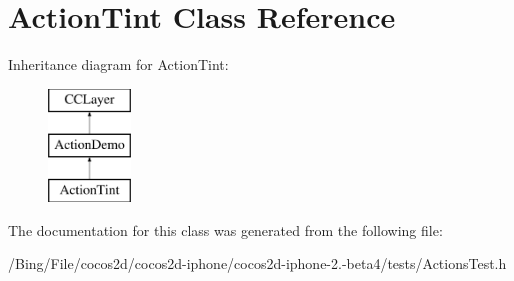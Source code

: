 \hypertarget{interface_action_tint}{\section{Action\-Tint Class Reference}
\label{interface_action_tint}
}
Inheritance diagram for Action\-Tint\-:\begin{figure}[H]
\begin{center}
\leavevmode
\includegraphics[height=3.000000cm]{interface_action_tint}
\end{center}
\end{figure}


The documentation for this class was generated from the following file\-:\begin{DoxyCompactItemize}
\item 
/\-Bing/\-File/cocos2d/cocos2d-\/iphone/cocos2d-\/iphone-\/2.-\/beta4/tests/Actions\-Test.\-h\end{DoxyCompactItemize}
